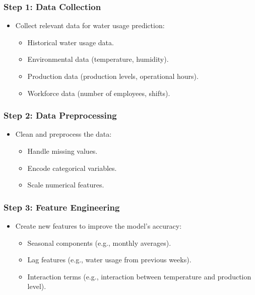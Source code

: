 \documentclass{beamer}
\begin{document}
\begin{frame}
\frametitle{Step 1: Data Collection}
\begin{itemize}
    \item Collect relevant data for water usage prediction:
        \begin{itemize}
            \item Historical water usage data.
            \item Environmental data (temperature, humidity).
            \item Production data (production levels, operational hours).
            \item Workforce data (number of employees, shifts).
        \end{itemize}
\end{itemize}
\end{frame}

\begin{frame}
\frametitle{Step 2: Data Preprocessing}
\begin{itemize}
    \item Clean and preprocess the data:
        \begin{itemize}
            \item Handle missing values.
            \item Encode categorical variables.
            \item Scale numerical features.
        \end{itemize}
\end{itemize}
\end{frame}

\begin{frame}
\frametitle{Step 3: Feature Engineering}
\begin{itemize}
    \item Create new features to improve the model's accuracy:
        \begin{itemize}
            \item Seasonal components (e.g., monthly averages).
            \item Lag features (e.g., water usage from previous weeks).
            \item Interaction terms (e.g., interaction between temperature and production level).
        \end{itemize}
\end{itemize}
\end{frame}
\end{document}
